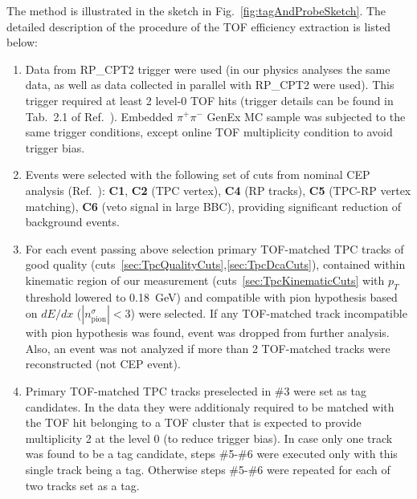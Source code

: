 The method is illustrated in the sketch in Fig.~\ref{fig:tagAndProbeSketch}. The detailed description of the procedure of the TOF efficiency extraction is listed below:
%
%
%
%
%
%
\begin{enumerate}
 \item Data from RP\_CPT2 trigger were used (in our physics analyses the same data, as well as data collected in parallel with RP\_CPT2 were used). This trigger required at least 2 level-0 TOF hits (trigger details can be found in Tab.~2.1 of Ref.~\cite{AnalysisNoteRafal}). Embedded $\pi^{+}\pi^{-}$ GenEx MC sample was subjected to the same trigger conditions, except online TOF multiplicity condition to avoid trigger bias.\\[-16pt]%
 \item Events were selected with the following set of cuts from nominal CEP analysis (Ref.~\cite{AnalysisNoteRafal}): \textbf{C1}, \textbf{C2} (TPC vertex), \textbf{C4} (RP tracks), \textbf{C5} (TPC-RP vertex matching), \textbf{C6} (veto signal in large BBC), providing significant reduction of background events.\\[-16pt]%
 \item For each event passing above selection primary TOF-matched TPC tracks of good quality (cuts~\ref{sec:TpcQualityCuts},\ref{sec:TpcDcaCuts}), contained within kinematic region of our measurement (cuts~\ref{sec:TpcKinematicCuts} with $p_{T}$ threshold lowered to 0.18~GeV) and compatible with pion hypothesis based on $dE/dx$ ($|n^{\sigma}_{\text{pion}}|<3$) were selected. If any TOF-matched track incompatible with pion hypothesis was found, event was dropped from further analysis. Also, an event was not analyzed if more than 2 TOF-matched tracks were reconstructed (not CEP event).\\[-16pt]%
 \item Primary TOF-matched TPC tracks preselected in \#3 were set as tag candidates. In the data they were additionaly required to be matched with the TOF hit belonging to a TOF cluster that is expected to provide multiplicity 2 at the level 0 (to reduce trigger bias). In case only one track was found to be a tag candidate, steps \#5-\#6 were executed only with this single track being a tag. Otherwise steps \#5-\#6 were repeated for each of two tracks set as a tag.\\[-16pt]%

\end{enumerate}
